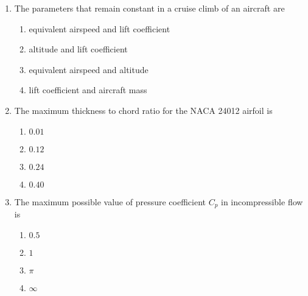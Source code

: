 \documentclass[journal]{IEEEtran}
\begin{document}
\begin{enumerate}
        \begin{multicols}{4}
            \begin{enumerate}
                \item $\sqrt{n-1}$
                \item $\sqrt{n+1}$
                \item $\sqrt{n^2-1}$
                \item $\sqrt{n^2+1}$
            \end{enumerate}
        \end{multicols}
		
    \item The parameters that remain constant in a cruise climb of an aircraft are 

        \begin{multicols}{2}
            \begin{enumerate}
                \item equivalent airspeed and lift coefficient
                \item altitude and lift coefficient
                \item equivalent airspeed and altitude
                \item lift coefficient and aircraft mass
            \end{enumerate}
        \end{multicols}

    \item The maximum thickness to chord ratio for the NACA 24012 airfoil is

        \begin{multicols}{4}
            \begin{enumerate}
                \item $0.01$
                \item $0.12$
                \item $0.24$
                \item $0.40$
            \end{enumerate}
        \end{multicols}

    \item The maximum possible value of pressure coefficient $C_p$ in incompressible flow is

        \begin{multicols}{4}
            \begin{enumerate}
                \item $0.5$
                \item $1$
                \item $\pi$
                \item $\infty$
            \end{enumerate}
        \end{multicols}
        

\end{enumerate}
\end{document}
